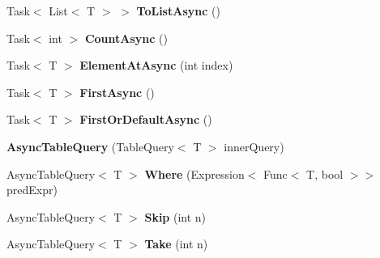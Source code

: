 \begin{DoxyCompactItemize}
\item 
\hypertarget{classSQLite_1_1AsyncTableQuery_3_01T_01_4_a7343ff525af21bdc055935f46a39ae72}{Task$<$ List$<$ T $>$ $>$ {\bfseries To\-List\-Async} ()}\label{classSQLite_1_1AsyncTableQuery_3_01T_01_4_a7343ff525af21bdc055935f46a39ae72}

\item 
\hypertarget{classSQLite_1_1AsyncTableQuery_3_01T_01_4_a70df4365834cfe29d0adb1c1841266b0}{Task$<$ int $>$ {\bfseries Count\-Async} ()}\label{classSQLite_1_1AsyncTableQuery_3_01T_01_4_a70df4365834cfe29d0adb1c1841266b0}

\item 
\hypertarget{classSQLite_1_1AsyncTableQuery_3_01T_01_4_ade7303c76081c4b9cd80b4d25806ca30}{Task$<$ T $>$ {\bfseries Element\-At\-Async} (int index)}\label{classSQLite_1_1AsyncTableQuery_3_01T_01_4_ade7303c76081c4b9cd80b4d25806ca30}

\item 
\hypertarget{classSQLite_1_1AsyncTableQuery_3_01T_01_4_a2e3bae8cc7dc0b16abd95d4516d61971}{Task$<$ T $>$ {\bfseries First\-Async} ()}\label{classSQLite_1_1AsyncTableQuery_3_01T_01_4_a2e3bae8cc7dc0b16abd95d4516d61971}

\item 
\hypertarget{classSQLite_1_1AsyncTableQuery_3_01T_01_4_aac82a5fa254a7f1c6a1a08f534989604}{Task$<$ T $>$ {\bfseries First\-Or\-Default\-Async} ()}\label{classSQLite_1_1AsyncTableQuery_3_01T_01_4_aac82a5fa254a7f1c6a1a08f534989604}

\item 
\hypertarget{classSQLite_1_1AsyncTableQuery_3_01T_01_4_a0255986ac768d5fca5b4e2c9840da35d}{{\bfseries Async\-Table\-Query} (Table\-Query$<$ T $>$ inner\-Query)}\label{classSQLite_1_1AsyncTableQuery_3_01T_01_4_a0255986ac768d5fca5b4e2c9840da35d}

\item 
\hypertarget{classSQLite_1_1AsyncTableQuery_3_01T_01_4_afe04f8363082a033b984230c7a245dea}{Async\-Table\-Query$<$ T $>$ {\bfseries Where} (Expression$<$ Func$<$ T, bool $>$$>$ pred\-Expr)}\label{classSQLite_1_1AsyncTableQuery_3_01T_01_4_afe04f8363082a033b984230c7a245dea}

\item 
\hypertarget{classSQLite_1_1AsyncTableQuery_3_01T_01_4_ab1b8210413273abe6bc9383bc4f7ea9c}{Async\-Table\-Query$<$ T $>$ {\bfseries Skip} (int n)}\label{classSQLite_1_1AsyncTableQuery_3_01T_01_4_ab1b8210413273abe6bc9383bc4f7ea9c}

\item 
\hypertarget{classSQLite_1_1AsyncTableQuery_3_01T_01_4_a6c47c652b3b8123e2d4961263c289af9}{Async\-Table\-Query$<$ T $>$ {\bfseries Take} (int n)}\label{classSQLite_1_1AsyncTableQuery_3_01T_01_4_a6c47c652b3b8123e2d4961263c289af9}


\end{DoxyCompactItemize}
